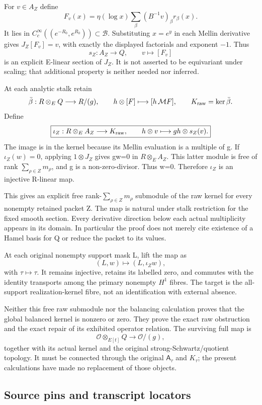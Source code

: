 \documentclass[10pt,a4paper,oneside]{report}
\begin{document}
For \(v\in A_Z\) define \[
F_v(x)=\eta(\log x)\sum_\beta(B^{-1}v)_\beta r_\beta(x).
\] It lies in \(C_c^\infty((e^{-R_0},e^{R_0}))\subset\mathscr B\). Substituting \(x=e^y\) in each Mellin derivative gives \(J_Z[F_v]=v\), with exactly the displayed factorials and exponent \(-1\). Thus \[
s_Z:A_Z\longrightarrow Q,\qquad v\longmapsto[F_v]
\] is an explicit E-linear section of \(J_Z\). It is not asserted to be equivariant under scaling; that additional property is neither needed nor inferred.

At each analytic stalk retain \[
\bar\beta:R\otimes_E Q\longrightarrow R/(g),\qquad
h\otimes[F]\longmapsto[h\,\mathcal MF],
\qquad K_{\rm raw}=\ker\bar\beta.
\] Define \[
\boxed{\iota_Z:R\otimes_E A_Z\longrightarrow K_{\rm raw},\qquad
h\otimes v\longmapsto gh\otimes s_Z(v).}
\] The image is in the kernel because its Mellin evaluation is a multiple of g. If \(\iota_Z(w)=0\), applying \(1\otimes J_Z\) gives gw=0 in \(R\otimes_E A_Z\). This latter module is free of rank \(\sum_{\rho\in Z}m_\rho\), and g is a non-zero-divisor. Thus w=0. Therefore \(\iota_Z\) is an injective R-linear map.

This gives an explicit free rank-\(\sum_{\rho\in Z}m_\rho\) submodule of the raw kernel for every nonempty retained packet Z. The map is natural under stalk restriction for the fixed smooth section. Every derivative direction below each actual multiplicity appears in its domain. In particular the proof does not merely cite existence of a Hamel basis for Q or reduce the packet to its values.

At each original nonempty support mask L, lift the map as \[
(L,w)\longmapsto(L,\iota_Zw),
\] with \(\tau\mapsto\tau\). It remains injective, retains its labelled zero, and commutes with the identity transports among the primary nonempty \(H^1\) fibres. The target is the all-support realization-kernel fibre, not an identification with external absence.

Neither this free raw submodule nor the balancing calculation proves that the global balanced kernel is nonzero or zero. They prove the exact raw obstruction and the exact repair of its exhibited operator relation. The surviving full map is \[
\mathcal O\otimes_{E[t]}Q\longrightarrow\mathcal O/(g),
\] together with its actual kernel and the original strong-Schwartz/quotient topology. It must be connected through the original \(\mathsf A_\tau\) and \(K_\tau\); the present calculations have made no replacement of those objects.

\subsection{Source pins and transcript locators}\label{proof06:typed-mellin:source-pins-and-transcript-locators}
\end{document}
